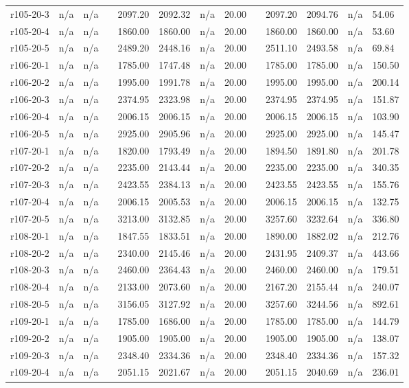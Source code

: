 \documentclass[final,5p,times,twocolumn]{elsarticle}
\begin{document}
{{{{{{{{{{{{{\begin{longtable}{l l l l l l l l l l l l l}
r105-20-3& n/a& n/a&&2097.20& 2092.32& n/a& 20.00&&2097.20& 2094.76& n/a& 54.06\\
r105-20-4& n/a& n/a&&1860.00& 1860.00& n/a& 20.00&&1860.00& 1860.00& n/a& 53.60\\
r105-20-5& n/a& n/a&&2489.20& 2448.16& n/a& 20.00&&2511.10& 2493.58& n/a& 69.84\\
r106-20-1& n/a& n/a&&1785.00& 1747.48& n/a& 20.00&&1785.00& 1785.00& n/a& 150.50\\
r106-20-2& n/a& n/a&&1995.00& 1991.78& n/a& 20.00&&1995.00& 1995.00& n/a& 200.14\\
r106-20-3& n/a& n/a&&2374.95& 2323.98& n/a& 20.00&&2374.95& 2374.95& n/a& 151.87\\
r106-20-4& n/a& n/a&&2006.15& 2006.15& n/a& 20.00&&2006.15& 2006.15& n/a& 103.90\\
r106-20-5& n/a& n/a&&2925.00& 2905.96& n/a& 20.00&&2925.00& 2925.00& n/a& 145.47\\
r107-20-1& n/a& n/a&&1820.00& 1793.49& n/a& 20.00&&1894.50& 1891.80& n/a& 201.78\\
r107-20-2& n/a& n/a&&2235.00& 2143.44& n/a& 20.00&&2235.00& 2235.00& n/a& 340.35\\
r107-20-3& n/a& n/a&&2423.55& 2384.13& n/a& 20.00&&2423.55& 2423.55& n/a& 155.76\\
r107-20-4& n/a& n/a&&2006.15& 2005.53& n/a& 20.00&&2006.15& 2006.15& n/a& 132.75\\
r107-20-5& n/a& n/a&&3213.00& 3132.85& n/a& 20.00&&3257.60& 3232.64& n/a& 336.80\\
r108-20-1& n/a& n/a&&1847.55& 1833.51& n/a& 20.00&&1890.00& 1882.02& n/a& 212.76\\
r108-20-2& n/a& n/a&&2340.00& 2145.46& n/a& 20.00&&2431.95& 2409.37& n/a& 443.66\\
r108-20-3& n/a& n/a&&2460.00& 2364.43& n/a& 20.00&&2460.00& 2460.00& n/a& 179.51\\
r108-20-4& n/a& n/a&&2133.00& 2073.60& n/a& 20.00&&2167.20& 2155.44& n/a& 240.07\\
r108-20-5& n/a& n/a&&3156.05& 3127.92& n/a& 20.00&&3257.60& 3244.56& n/a& 892.61\\
r109-20-1& n/a& n/a&&1785.00& 1686.00& n/a& 20.00&&1785.00& 1785.00& n/a& 144.79\\
r109-20-2& n/a& n/a&&1905.00& 1905.00& n/a& 20.00&&1905.00& 1905.00& n/a& 138.07\\
r109-20-3& n/a& n/a&&2348.40& 2334.36& n/a& 20.00&&2348.40& 2334.36& n/a& 157.32\\
r109-20-4& n/a& n/a&&2051.15& 2021.67& n/a& 20.00&&2051.15& 2040.69& n/a& 236.01\\

\end{longtable}}}}}}}}}}}}}}
\end{document}
